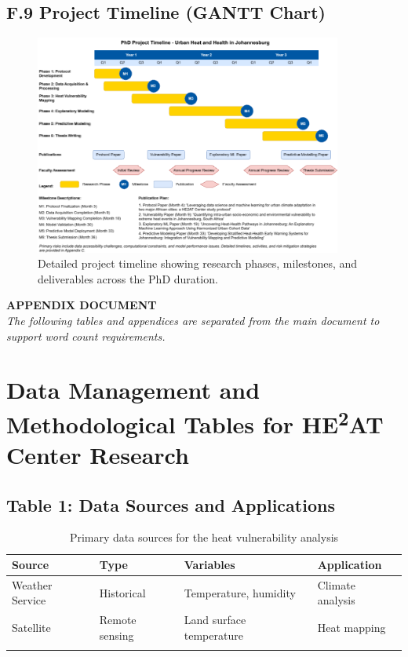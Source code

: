 \documentclass[12pt,a4paper,landscape]{article}
\begin{document}
\subsection*{F.9 Project Timeline (GANTT Chart)}
\begin{figure}[H]
    \centering
    \includegraphics[width=0.9\textwidth]{images/GNT.png}
    \caption{Detailed project timeline showing research phases, milestones, and deliverables across the PhD duration.}
    \label{fig:gantt}
\end{figure}

\begin{center}
    \Large\textbf{APPENDIX DOCUMENT}\\[0.5em]
    \normalsize\textit{The following tables and appendices are separated from the main document to support word count requirements.}
\end{center}

\section*{Data Management and Methodological Tables for HE\textsuperscript{2}AT Center Research}

\subsection*{Table 1: Data Sources and Applications}
\begin{longtable}{p{3cm}p{3cm}p{4cm}p{3cm}}
\toprule
\textbf{Source} & \textbf{Type} & \textbf{Variables} & \textbf{Application} \\
\midrule
\endhead

Weather Service & Historical & Temperature, humidity & Climate analysis \\
\midrule
Satellite & Remote sensing & Land surface temperature & Heat mapping \\
\bottomrule
\caption{Primary data sources for the heat vulnerability analysis}
\end{longtable}
\end{document}
